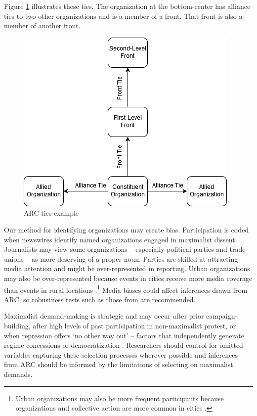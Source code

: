 Figure \ref{fig:arc ties} illustrates these ties. The organization at the bottom-center has alliance ties to two other organizations and is a member of a front. That front is also a member of another front. 

\begin{figure}
    \centering
    \includegraphics[width = 0.9\columnwidth]{img/example_ties.jpg}
    \caption{ARC ties example}
    \label{fig:arc ties}
\end{figure}




Our method for identifying organizations may create bias. Participation is coded when newswires identify named organizations engaged in maximalist dissent. Journalists may view some organizations -- especially political parties and trade unions -- as more deserving of a proper noun. Parties are skilled at attracting media attention and might be over-represented in reporting. Urban organizations may also be over-represented because events in cities receive more media coverage than events in rural locations \citep{Kalyvas2004, Eck2012, Day2015}.\footnote{Urban organizations may also be more frequent participants because organizations and collective action are more common in cities \citep{Weidmann2018, Nicholls2008, Miller2013}.} Media biases could affect inferences drawn from ARC, so robustness tests such as those from \citet{Weidmann2016} are recommended. 

Maximalist demand-making is strategic and may occur after prior campaign-building, after high levels of past participation in non-maximalist protest, or when repression offers `no other way out' \citep{Goodwin2001} -- factors that independently generate regime concessions or democratization \citep{Brancati2016, Klein2018}. Researchers should control for omitted variables capturing these selection processes wherever possible and inferences from ARC should be informed by the limitations of selecting on maximalist demands.

